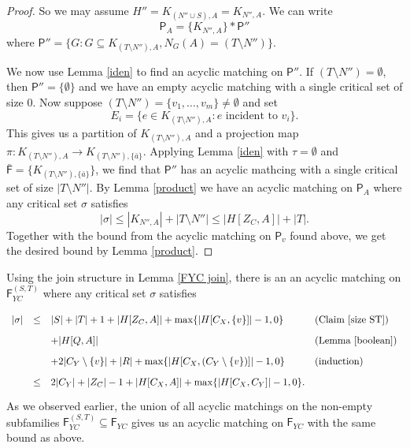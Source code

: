 \documentclass[10pt]{amsart}
\theoremstyle{definition}
\begin{document}
\begin{proof}
		
		
		
		
		
		
		
		So we may assume $H'' = K_{(N''\cup S), A}=K_{N'', A}$.  We can write 
		\[\mathsf{P}_A = \{K_{N'', A}\} * \mathsf{P}'' \]
		where $\mathsf{P}'' = \{G : G\subseteq K_{(T\setminus N''), A}, N_G(A) = (T\setminus N'')\}$. 
		
		We now use Lemma \ref{iden} to find an acyclic matching on $\mathsf{P}''$. 
		If $(T\setminus N'') = \emptyset$, then $\mathsf{P}'' = \{\emptyset\}$ and we have an empty acyclic matching with a single critical set of size $0$.  Now suppose $(T \setminus  N'') = \{v_1, \dots, v_m\} \neq \emptyset$ and 
		set \[E_i = \{e\in K_{(T \setminus N''), A} : e \text{ incident to } v_i\}.\] This  gives us a partition of $K_{(T\setminus N''), A}$ and a projection map $\pi: K_{(T\setminus N''), A} \to K_{(T\setminus N''), \{\bar{a}\}}$. Applying Lemma \ref{iden} with $\tau=\emptyset$ and $\bar{\mathsf{F}} = \{ K_{(T\setminus N''), \{\bar{a}\}} \}$, we find that $\mathsf{P}''$ 
		has an acyclic mathcing with a single critical set of size $|T\setminus N''|$. By Lemma \ref{product} we have an acyclic matching on $\mathsf{P}_A$ where any critical set $\sigma$ satisfies
		\[|\sigma| \leq |K_{N'', A}| + |T\setminus N''| \leq |H[Z_C, A]| + |T|.\]
		Together with the bound from the acyclic matching on $\mathsf{P}_v$ found above, we get the desired bound by Lemma \ref{product}.
	\end{proof}
	
	Using the join structure in Lemma \ref{FYC join}, there is an an acyclic matching on $\mathsf{F}_{YC}^{(S,T)}$ where any critical set $\sigma$ satisfies
	\[
	\def\arraystretch{1.75}
	\begin{array}{rcll}
	|\sigma| & \leq & |S| + |T| + 1 +|H[Z_C, A]|  + \max\{|H[C_X, \{v\}]| - 1, 0\} &  \text{(Claim \ref{size ST})} \\
	&& + |H[Q,A]| & \text{(Lemma \ref{boolean})} \\
	&& + 2|C_Y\setminus \{v\}| + |R| + \max\{|H[C_X, (C_Y\setminus \{v\})]|-1, 0\} & \text{(induction)} \\
	&\leq & 2|C_Y| + |Z_C| - 1 + |H[C_X,A]| + \max\{|H[C_X, C_Y]|-1, 0\}.
	\end{array}\]
	As we observed earlier, the union of all acyclic matchings on the non-empty subfamilies $\mathsf{F}_{YC}^{(S,T)}\subseteq \mathsf{F}_{YC}$ gives us an acyclic matching on $\mathsf{F}_{YC}$ with the same bound as above. 
	
\end{document}
